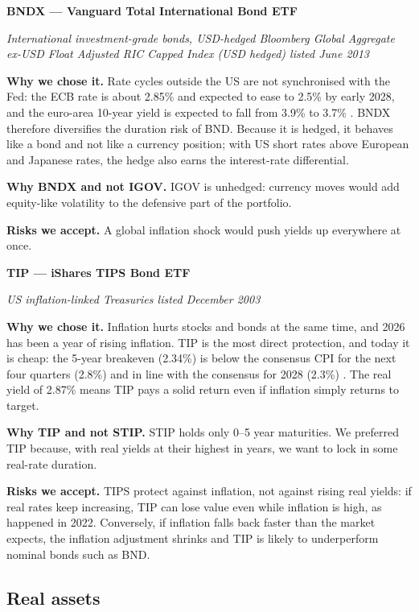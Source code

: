 \textbf{BNDX --- Vanguard Total International Bond ETF}

\emph{International investment-grade bonds, USD-hedged \textperiodcentered{} Bloomberg
Global Aggregate ex-USD Float Adjusted RIC Capped Index (USD hedged) \textperiodcentered{}
listed June 2013}

\textbf{Why we chose it.} Rate cycles outside the US are not
synchronised with the Fed: the ECB rate is about 2.85\% and expected to
ease to 2.5\% by early 2028, and the euro-area 10-year yield is expected
to fall from 3.9\% to 3.7\% \cite{ecfc}. BNDX therefore diversifies the
duration risk of BND. Because it is hedged, it behaves like a bond and
not like a currency position; with US short rates above European and
Japanese rates, the hedge also earns the interest-rate differential.

\textbf{Why BNDX and not IGOV.} IGOV is unhedged: currency moves would
add equity-like volatility to the defensive part of the portfolio.

\textbf{Risks we accept.} A global inflation shock would push yields up
everywhere at once.

\textbf{TIP --- iShares TIPS Bond ETF}

\emph{US inflation-linked Treasuries \textperiodcentered{} listed December 2003}

\textbf{Why we chose it.} Inflation hurts stocks and bonds at the same
time, and 2026 has been a year of rising inflation. TIP is the most
direct protection, and today it is cheap: the 5-year breakeven (2.34\%)
is below the consensus CPI for the next four quarters (2.8\%) and in
line with the consensus for 2028 (2.3\%) \cite{ecfc,fred}. The real yield of
2.87\% means TIP pays a solid return even if inflation simply returns to
target.

\textbf{Why TIP and not STIP.} STIP holds only 0--5 year maturities. We
preferred TIP because, with real yields at their highest in years, we
want to lock in some real-rate duration.

\textbf{Risks we accept.} TIPS protect against inflation, not against
rising real yields: if real rates keep increasing, TIP can lose value
even while inflation is high, as happened in 2022. Conversely, if
inflation falls back faster than the market expects, the inflation
adjustment shrinks and TIP is likely to underperform nominal bonds such
as BND.

\subsection*{Real assets}\label{sec:real-assets}

